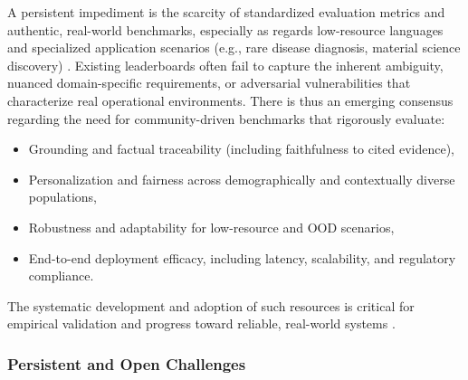\documentclass[sigconf]{acmart}
\begin{document}
A persistent impediment is the scarcity of standardized evaluation metrics and authentic, real-world benchmarks, especially as regards low-resource languages and specialized application scenarios (e.g., rare disease diagnosis, material science discovery) \cite{ref8,ref16,ref20,ref25,ref29,ref32,ref36,ref39,ref40,ref46,ref47,ref48,ref50,ref53,ref54,ref55}. Existing leaderboards often fail to capture the inherent ambiguity, nuanced domain-specific requirements, or adversarial vulnerabilities that characterize real operational environments. There is thus an emerging consensus regarding the need for community-driven benchmarks that rigorously evaluate:
\begin{itemize}
    \item Grounding and factual traceability (including faithfulness to cited evidence),
    \item Personalization and fairness across demographically and contextually diverse populations,
    \item Robustness and adaptability for low-resource and OOD scenarios,
    \item End-to-end deployment efficacy, including latency, scalability, and regulatory compliance.
\end{itemize}
The systematic development and adoption of such resources is critical for empirical validation and progress toward reliable, real-world systems \cite{ref8,ref32,ref55}.

\subsubsection{Persistent and Open Challenges}
\end{document}
